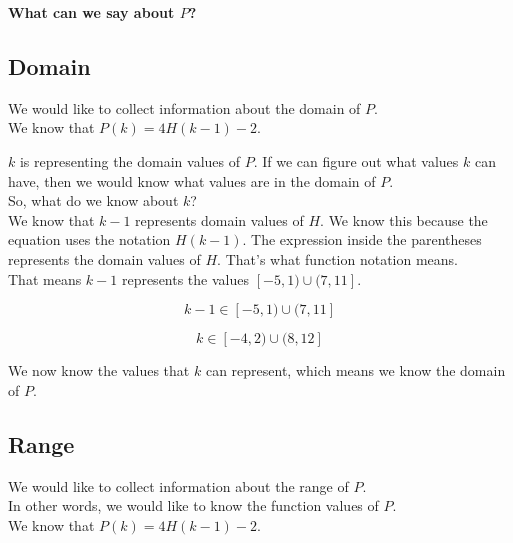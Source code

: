 \documentclass{ximera}
\begin{document}
\textbf{\textcolor{blue!55!black}{What can we say about $P$?}}  \\



\subsection*{Domain}


We would like to collect information about the domain of $P$. \\

We know that $P(k) = 4 H(k-1) - 2$.

$k$ is representing the domain values of $P$.  If we can figure out what values $k$ can have, then we would know what values are in the domain of $P$. \\

So, what do we know about $k$? \\


We know that $k-1$ represents domain values of $H$.  We know this because the equation uses the notation $H(k-1)$.  The expression inside the parentheses represents the domain values of $H$.  That's what function notation means. \\


That means $k-1$ represents the values  $[-5, 1) \cup (7, 11]$.


\[
k - 1 \in [-5, 1) \cup (7, 11]
\]


\[
k \in [-4, 2) \cup (8, 12]
\]



We now know the values that $k$ can represent, which means we know the domain of $P$. \\












\subsection*{Range}


We would like to collect information about the range of $P$. \\

In other words, we would like to know the function values of $P$. \\ 


We know that $P(k) = 4 H(k-1) - 2$.\\
\end{document}
